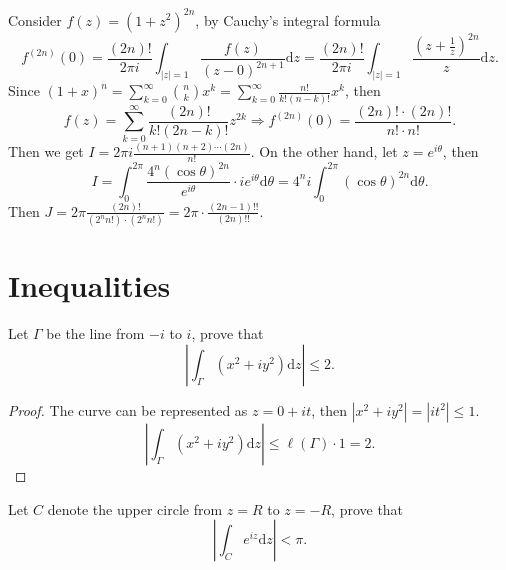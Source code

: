\begin{solution}
  Consider $f(z) = (1 + z^2)^{2n}$, by Cauchy's integral formula
  \begin{equation}
    f^{(2n)}(0) = \frac{(2n)!}{2 \pi i} \int_{|z| = 1} \frac{f(z)}{(z - 0)^{2n+1}}\mathrm{d} z
    = \frac{(2n)!}{2 \pi i} \int_{|z| = 1} \frac{(z + \frac{1}{z})^{2n}}{z}\mathrm{d} z.
  \end{equation}
  Since $(1 + x)^n = \sum_{k = 0}^{\infty} \binom{n}{k} x^k = \sum_{k = 0}^{\infty} \frac{n!}{k!(n-k)!}x^k$,
  then
  \begin{equation}
    f(z) = \sum\limits_{k = 0}^{\infty} \frac{(2n)!}{k!(2n-k)!}z^{2k}
    \Rightarrow
    f^{(2n)}(0) = \frac{(2n)! \cdot (2n)!}{n! \cdot n!}.
  \end{equation}
  Then we get $I = 2\pi i \frac{(n+1)(n+2)\cdots (2n)}{n!}$.
  On the other hand, let $z = e^{i\theta}$, then
  \begin{equation}
    I = \int_0^{2\pi} \frac{4^n (\cos \theta)^{2n}}{e^{i \theta}} \cdot i e^{i\theta} \mathrm{d} \theta
    = 4^n i \int_0^{2\pi} (\cos \theta)^{2n} \mathrm{d} \theta.
  \end{equation}
  Then $J = 2 \pi \frac{(2n)!}{(2^n n!) \cdot (2^n n!)} = 2 \pi \cdot \frac{(2n-1)!!}{(2n)!!}$.
\end{solution}

\section{Inequalities}

\begin{exercise}{}{}
  Let $\Gamma$ be the line from $-i$ to $i$, prove that
  \begin{equation}
    \left| \int_{\Gamma} (x^2 + iy^2)\mathrm{d} z \right| \leq 2.
  \end{equation}
\end{exercise}

\begin{proof}
  The curve can be represented as $z = 0 + it$, then
  $|x^2 + iy^2| = |it^2| \leq 1$.
  \begin{equation}
    \left| \int_{\Gamma} (x^2 + iy^2)\mathrm{d} z \right|
    \leq \ell(\Gamma) \cdot 1 = 2.
  \end{equation}
\end{proof}

\begin{exercise}{}{}
  Let $C$ denote the upper circle from $z = R$ to $z = -R$, prove that
  \begin{equation}
    \left| \int_C e^{iz}\mathrm{d} z \right| < \pi.
  \end{equation}
\end{exercise}

